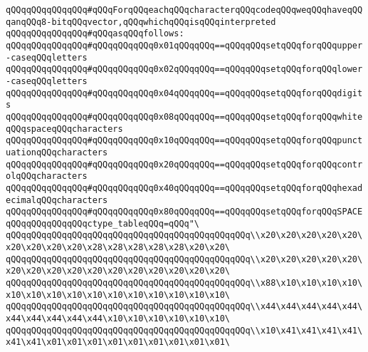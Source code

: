\newline
\verb|qQQqqQQqqQQqqQQq#qQQqForqQQqeachqQQqcharacterqQQqcodeqQQqweqQQqhaveqQQqanqQQq8-bitqQQqvector,qQQqwhichqQQqisqQQqinterpreted|\newline
\verb|qQQqqQQqqQQqqQQq#qQQqasqQQqfollows:|\newline
\verb|qQQqqQQqqQQqqQQq#qQQqqQQqqQQq0x01qQQqqQQq==qQQqqQQqsetqQQqforqQQqupper-caseqQQqletters|\newline
\verb|qQQqqQQqqQQqqQQq#qQQqqQQqqQQq0x02qQQqqQQq==qQQqqQQqsetqQQqforqQQqlower-caseqQQqletters|\newline
\verb|qQQqqQQqqQQqqQQq#qQQqqQQqqQQq0x04qQQqqQQq==qQQqqQQqsetqQQqforqQQqdigits|\newline
\verb|qQQqqQQqqQQqqQQq#qQQqqQQqqQQq0x08qQQqqQQq==qQQqqQQqsetqQQqforqQQqwhiteqQQqspaceqQQqcharacters|\newline
\verb|qQQqqQQqqQQqqQQq#qQQqqQQqqQQq0x10qQQqqQQq==qQQqqQQqsetqQQqforqQQqpunctuationqQQqcharacters|\newline
\verb|qQQqqQQqqQQqqQQq#qQQqqQQqqQQq0x20qQQqqQQq==qQQqqQQqsetqQQqforqQQqcontrolqQQqcharacters|\newline
\verb|qQQqqQQqqQQqqQQq#qQQqqQQqqQQq0x40qQQqqQQq==qQQqqQQqsetqQQqforqQQqhexadecimalqQQqcharacters|\newline
\verb|qQQqqQQqqQQqqQQq#qQQqqQQqqQQq0x80qQQqqQQq==qQQqqQQqsetqQQqforqQQqSPACE|\newline
\newline
\verb|qQQqqQQqqQQqqQQqctype_tableqQQq=qQQq"\|\newline
\verb|qQQqqQQqqQQqqQQqqQQqqQQqqQQqqQQqqQQqqQQqqQQqqQQq\\x20\x20\x20\x20\x20\x20\x20\x20\x20\x28\x28\x28\x28\x28\x20\x20\|\newline
\verb|qQQqqQQqqQQqqQQqqQQqqQQqqQQqqQQqqQQqqQQqqQQqqQQq\\x20\x20\x20\x20\x20\x20\x20\x20\x20\x20\x20\x20\x20\x20\x20\x20\|\newline
\verb|qQQqqQQqqQQqqQQqqQQqqQQqqQQqqQQqqQQqqQQqqQQqqQQq\\x88\x10\x10\x10\x10\x10\x10\x10\x10\x10\x10\x10\x10\x10\x10\x10\|\newline
\verb|qQQqqQQqqQQqqQQqqQQqqQQqqQQqqQQqqQQqqQQqqQQqqQQq\\x44\x44\x44\x44\x44\x44\x44\x44\x44\x44\x10\x10\x10\x10\x10\x10\|\newline
\verb|qQQqqQQqqQQqqQQqqQQqqQQqqQQqqQQqqQQqqQQqqQQqqQQq\\x10\x41\x41\x41\x41\x41\x41\x01\x01\x01\x01\x01\x01\x01\x01\x01\|\newline
